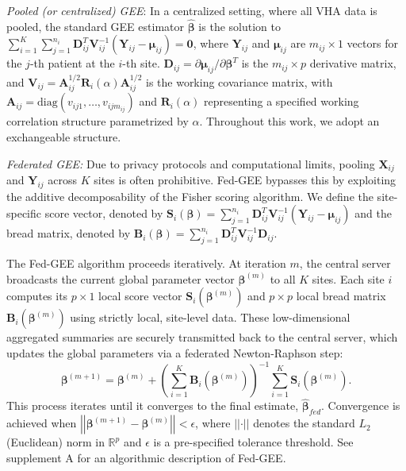 \documentclass[useAMS,referee, usegraphicx]{biom}
\begin{document}
\emph{Pooled (or centralized) GEE}: In a centralized setting, where all VHA data is pooled, the standard GEE estimator $\hat{\boldsymbol{\beta}}$ is the solution to $\sum_{i=1}^K \sum_{j=1}^{n_i} \mathbf{D}_{ij}^T \mathbf{V}_{ij}^{-1} (\mathbf{Y}_{ij} - \boldsymbol{\mu}_{ij}) = \mathbf{0}$, 
where $\mathbf{Y}_{ij}$ and $\boldsymbol{\mu}_{ij}$ are $m_{ij} \times 1$ vectors for the $j$-th patient at the $i$-th site. $\mathbf{D}_{ij} = \partial \boldsymbol{\mu}_{ij} / \partial \boldsymbol{\beta}^T$ is the $m_{ij} \times p$ derivative matrix, and $\mathbf{V}_{ij} = \mathbf{A}_{ij}^{1/2} \mathbf{R}_i(\alpha) \mathbf{A}_{ij}^{1/2}$ is the working covariance matrix, with $\mathbf{A}_{ij} = \text{diag}(v_{ij1}, \dots, v_{ijm_{ij}})$ and $\mathbf{R}_i(\alpha)$ representing a specified working correlation structure parametrized by $\alpha$. Throughout this work, we adopt an exchangeable structure.

\emph{Federated GEE:} Due to privacy protocols and computational limits, pooling $\mathbf{X}_{ij}$ and $\mathbf{Y}_{ij}$ across $K$ sites is often prohibitive. Fed-GEE bypasses this by exploiting the additive decomposability of the Fisher scoring algorithm. We define the site-specific score vector, denoted by $\mathbf{S}_i\left(\boldsymbol{\beta}\right) = \sum_{j=1}^{n_i} \mathbf{D}_{ij}^T \mathbf{V}_{ij}^{-1} (\mathbf{Y}_{ij} - \boldsymbol{\mu}_{ij})$ and the bread matrix, denoted by $\mathbf{B}_i\left(\boldsymbol{\beta}\right) = \sum_{j=1}^{n_i} \mathbf{D}_{ij}^T \mathbf{V}_{ij}^{-1} \mathbf{D}_{ij}$.

The Fed-GEE algorithm proceeds iteratively. At iteration $m$, the central server broadcasts the current global parameter vector $\boldsymbol{\beta}^{(m)}$ to all $K$ sites. Each site $i$ computes its $p \times 1$ local score vector $\mathbf{S}_i\left(\boldsymbol{\beta}^{(m)}\right)$ and $p \times p$ local bread matrix $\mathbf{B}_i\left(\boldsymbol{\beta}^{(m)}\right)$ using strictly local, site-level data. These low-dimensional aggregated summaries are securely transmitted back to the central server, which updates the global parameters via a federated Newton-Raphson step:
\begin{equation}\label{eq:fedgee_update}
\boldsymbol{\beta}^{(m+1)} = \boldsymbol{\beta}^{(m)} + \left( \sum_{i=1}^K \mathbf{B}_i \left(\boldsymbol{\beta}^{(m)}\right) \right)^{-1} \sum_{i=1}^K \mathbf{S}_i\left(\boldsymbol{\beta}^{(m)}\right).
\end{equation}
This process iterates until it converges to the final estimate, $\hat{\boldsymbol{\beta}}_{fed}$. Convergence is achieved when $\left|\left|\boldsymbol{\beta}^{(m+1)} - \boldsymbol{\beta}^{(m)}\right|\right| < \epsilon$, where $\left|\left| \cdot \right|\right|$ denotes the standard $L_2$ (Euclidean) norm in $\mathbb{R}^p$ and $\epsilon$ is a pre-specified tolerance threshold. {See supplement A for an algorithmic description of Fed-GEE.}
\end{document}
